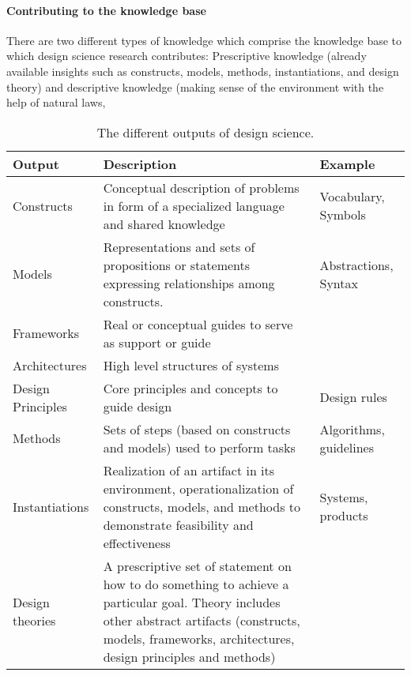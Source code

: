 \paragraph{Contributing to the knowledge base} There are two different types of knowledge which comprise the knowledge base to which design science research contributes: Prescriptive knowledge (already available insights such as constructs, models, methods, instantiations, and design theory) and descriptive knowledge (making sense of the environment with the help of natural laws,
\begin{table}[H]
\setlength\extrarowheight{2pt} %
  \centering
  \begin{tabularx}{\textwidth}{|l|X|l|}
    \hline
        \textbf{Output} & \textbf{Description} & \textbf{Example}  \\ \hline\hline
        Constructs & Conceptual description of problems in form of a specialized language and shared knowledge & Vocabulary, Symbols \\
        Models & Representations and sets of propositions or statements expressing relationships among constructs. & Abstractions, Syntax \\
        Frameworks & Real or conceptual guides to serve as support or guide & \\
        Architectures & High level structures of systems & \\ 
        Design Principles & Core principles and concepts to guide design & Design rules \\
        Methods & Sets of steps (based on constructs and models) used to perform tasks & Algorithms, guidelines \\
        Instantiations & Realization of an artifact in its environment, operationalization of constructs, models, and methods to demonstrate feasibility and effectiveness & Systems, products \\
        Design theories & A prescriptive set of statement on how to do something to achieve a particular goal. Theory includes other abstract artifacts (constructs, models, frameworks, architectures, design principles and methods) & \\ \hline
    \end{tabularx}
    \caption[The different outputs of design science.]{The different outputs of design science.\protect\footnotemark }
    \label{tab:Artifacts}
\end{table}

